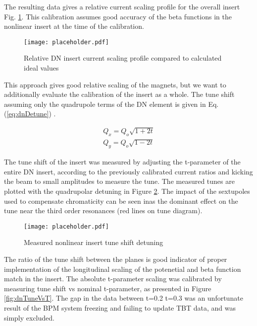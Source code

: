 The resulting data gives a relative current scaling profile for the overall insert Fig. \ref{fig:dnIscaling}. This calibration assumes good accuracy of the beta functions in the nonlinear insert at the time of the calibration.

\begin{figure}
    \centering
    \texttt{[image: placeholder.pdf]}
    \caption{Relative DN insert current scaling profile compared to calculated ideal values}
    \label{fig:dnIscaling}
\end{figure}

This approach gives good relative scaling of the magnets, but we want to additionally evaluate the calibration of the insert as a whole. The tune shift assuming only the quadrupole terms of the DN element is given in Eq. (\ref{eq:dnDetune}) \cite{nagaitsevNonlinearOptics}.

\begin{equation}
	\begin{split}
	Q_{x} = Q_{o}\sqrt{1+2t} \\
        Q_{y} = Q_{o}\sqrt{1-2t}
	\end{split}
	\label{eq:dnDetune}
\end{equation}

The tune shift of the insert was measured by adjusting the t-parameter of the entire DN insert, according to the previously calibrated current ratios and kicking the beam to small amplitudes to measure the tune. The measured tunes are plotted with the quadrupolar detuning in Figure \ref{fig:dnDetuning}. The impact of the sextupoles used to compensate chromaticity can be seen inas the dominant effect on the tune near the third order resonances (red lines on tune diagram).

\begin{figure}
    \centering
    \texttt{[image: placeholder.pdf]}
    \caption{Measured nonlinear insert tune shift detuning}
    \label{fig:dnDetuning}
\end{figure}

The ratio of the tune shift between the planes is good indicator of proper implementation of the longitudinal scaling of the potenetial and beta function match in the insert. The absolute t-parameter scaling was calibrated by measuring tune shift vs nominal t-parameter, as presented in Figure \ref{fig:dnTuneVsT}. The gap in the data between t=0.2 t=0.3 was an unfortunate result of the BPM system freezing and failing to update TBT data, and was simply excluded.

